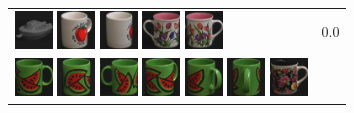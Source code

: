 \begin{figure}[tbp]
\begin{center}
\begin{tabular}{m{11cm} | m{3cm} |}
\includegraphics[width=1cm]{coil/beeld-29.eps}
\includegraphics[width=1cm]{coil/beeld-39.eps}
\includegraphics[width=1cm]{coil/beeld-38.eps}
\includegraphics[width=1cm]{coil/beeld-7.eps}
\includegraphics[width=1cm]{coil/beeld-6.eps}
& {\scriptsize 0.0}
\\
\includegraphics[width=1cm]{coil/beeld-30.eps}
\includegraphics[width=1cm]{coil/beeld-32.eps}
\includegraphics[width=1cm]{coil/beeld-31.eps}
\includegraphics[width=1cm]{coil/beeld-33.eps}
\includegraphics[width=1cm]{coil/beeld-34.eps}
\includegraphics[width=1cm]{coil/beeld-35.eps}
\includegraphics[width=1cm]{coil/beeld-60.eps}

\end{tabular}
\end{center}
\end{figure}
